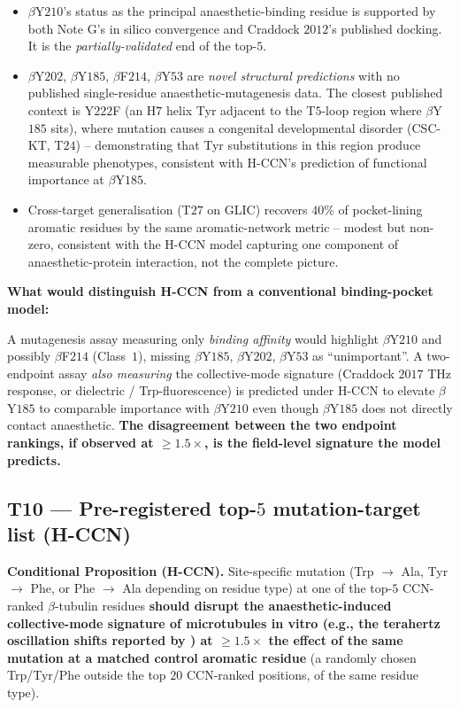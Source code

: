 \documentclass[11pt,a4paper]{article}
\begin{document}
\begin{itemize}\itemsep0pt
  \item $\beta$Y$210$'s status as the principal anaesthetic-binding
    residue is supported by both Note G's in silico convergence and
    Craddock $2012$'s published docking. It is the \emph{partially-validated}
    end of the top-$5$.
  \item $\beta$Y$202$, $\beta$Y$185$, $\beta$F$214$, $\beta$Y$53$
    are \emph{novel structural predictions} with no published single-residue
    anaesthetic-mutagenesis data. The closest published context is
    Y$222$F (an H$7$ helix Tyr adjacent to the T$5$-loop region where
    $\beta$Y$185$ sits), where mutation causes a congenital developmental
    disorder (CSC-KT, T$24$) -- demonstrating that Tyr substitutions in
    this region produce measurable phenotypes, consistent with H-CCN's
    prediction of functional importance at $\beta$Y$185$.
  \item Cross-target generalisation (T$27$ on GLIC) recovers $40\%$
    of pocket-lining aromatic residues by the same aromatic-network
    metric -- modest but non-zero, consistent with the H-CCN model
    capturing one component of anaesthetic-protein interaction, not
    the complete picture.
\end{itemize}

\textbf{What would distinguish H-CCN from a conventional binding-pocket
model:}

A mutagenesis assay measuring only \emph{binding affinity} would highlight
$\beta$Y$210$ and possibly $\beta$F$214$ (Class~$1$), missing $\beta$Y$185$,
$\beta$Y$202$, $\beta$Y$53$ as ``unimportant''. A two-endpoint assay
\emph{also measuring} the collective-mode signature (Craddock $2017$
THz response, or dielectric / Trp-fluorescence) is predicted under H-CCN
to elevate $\beta$Y$185$ to comparable importance with $\beta$Y$210$
even though $\beta$Y$185$ does not directly contact anaesthetic.
\textbf{The disagreement between the two endpoint rankings, if observed
at $\geq 1.5\times$, is the field-level signature the model predicts.}

\subsection{\textsf{T10} --- Pre-registered top-$5$ mutation-target list (H-CCN)}\label{ssec:t10}

\textbf{Conditional Proposition (H-CCN).} Site-specific mutation
(Trp $\to$ Ala, Tyr $\to$ Phe, or Phe $\to$ Ala depending on residue
type) at one of the top-$5$ CCN-ranked $\beta$-tubulin residues
\textbf{should disrupt the anaesthetic-induced collective-mode signature
of microtubules in vitro (e.g., the terahertz oscillation shifts
reported by \citet{Craddock2017}) at $\geq 1.5\times$ the effect of
the same mutation at a matched control aromatic residue} (a randomly
chosen Trp/Tyr/Phe outside the top $20$ CCN-ranked positions, of
the same residue type).
\end{document}
